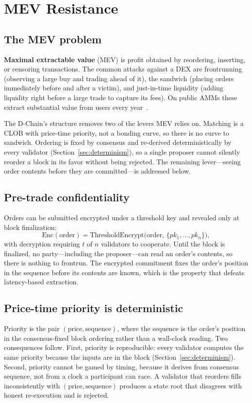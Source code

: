 \section{MEV Resistance}
\label{sec:mev}

\subsection{The MEV problem}

\textbf{Maximal extractable value} (MEV) is profit obtained by reordering, inserting, or
censoring transactions. The common attacks against a DEX are frontrunning (observing a
large buy and trading ahead of it), the sandwich (placing orders immediately before and
after a victim), and just-in-time liquidity (adding liquidity right before a large trade
to capture its fees). On public AMMs these extract substantial value from users every
year~\cite{daian2020,flashbots2024}.

The D-Chain's structure removes two of the levers MEV relies on. Matching is a CLOB with
price-time priority, not a bonding curve, so there is no curve to sandwich. Ordering is
fixed by consensus and re-derived deterministically by every validator
(Section~\ref{sec:determinism}), so a single proposer cannot silently reorder a block in
its favor without being rejected. The remaining lever---seeing order contents before they
are committed---is addressed below.

\subsection{Pre-trade confidentiality}

Orders can be submitted encrypted under a threshold key and revealed only at block
finalization:
\[
  \mathrm{Enc}(\mathrm{order}) = \mathrm{ThresholdEncrypt}\big(\mathrm{order},\,
    \{pk_1,\dots,pk_n\}\big),
\]
with decryption requiring $t$ of $n$ validators to cooperate. Until the block is
finalized, no party---including the proposer---can read an order's contents, so there is
nothing to frontrun. The encrypted commitment fixes the order's position in the sequence
before its contents are known, which is the property that defeats latency-based
extraction.

\subsection{Price-time priority is deterministic}

Priority is the pair $(\mathrm{price}, \mathrm{sequence})$, where the sequence is the
order's position in the consensus-fixed block ordering rather than a wall-clock reading.
Two consequences follow. First, priority is reproducible: every validator computes the
same priority because the inputs are in the block (Section~\ref{sec:determinism}).
Second, priority cannot be gamed by timing, because it derives from consensus sequence,
not from a clock a participant can race. A validator that reorders fills inconsistently
with $(\mathrm{price}, \mathrm{sequence})$ produces a state root that disagrees with
honest re-execution and is rejected.

